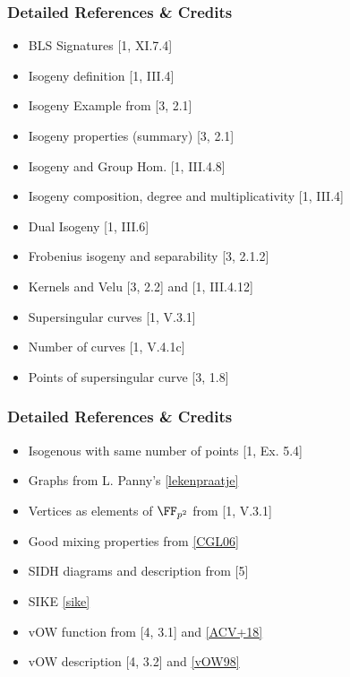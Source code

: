 \documentclass{beamer}
\begin{document}
\begin{frame}[noframenumbering]
    \frametitle{Detailed References \& Credits}
    \begin{itemize}
       
        
        \item BLS Signatures [1, XI.7.4]
        \item Isogeny definition [1, III.4]
        \item Isogeny Example from [3, 2.1]
        \item Isogeny properties (summary) [3, 2.1]
        \item Isogeny and Group Hom. [1, III.4.8]
        \item Isogeny composition, degree and multiplicativity [1, III.4]
        \item Dual Isogeny [1, III.6]
        \item Frobenius isogeny and separability [3, 2.1.2]
        \item Kernels and Velu [3, 2.2] and [1, III.4.12]
        \item Supersingular curves [1, V.3.1]
        \item Number of curves [1, V.4.1c]
        \item Points of supersingular curve [3, 1.8]
      \end{itemize}
\end{frame}


\begin{frame}[noframenumbering]
    \frametitle{Detailed References \& Credits}
    \begin{itemize}
        \item Isogenous with same number of points [1, Ex. 5.4]
        \item Graphs from L. Panny's \href{https://yx7.cc/docs/phd/lekenpraatje.pdf}{[lekenpraatje]}
        \item Vertices as elements of $\FF_{p^2}$ from [1, V.3.1]
        \item Good mixing properties from \href{https://eprint.iacr.org/2006/021.pdf}{[CGL06]}
        \item SIDH diagrams and description from [5]
        \item SIKE \href{https://sike.org}{[sike]}
        \item vOW function from [4, 3.1] and \href{https://eprint.iacr.org/2018/313.pdf}{[ACV+18]}
        \item vOW description [4, 3.2] and \href{https://link.springer.com/content/pdf/10.1007/PL00003816.pdf}{[vOW98]}
      \end{itemize}
\end{frame}
\end{document}
